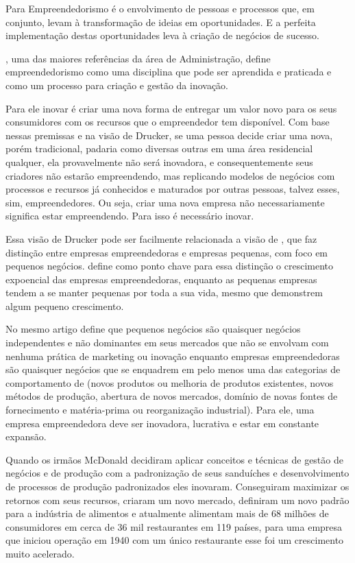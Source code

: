 Para  Empreendedorismo é o envolvimento de pessoas e processos que, em conjunto, levam à transformação de ideias em oportunidades. E a perfeita implementação destas oportunidades leva à criação de negócios de sucesso.

, uma das maiores referências da área de Administração, define empreendedorismo como uma disciplina que pode ser aprendida e praticada e como um processo para criação e gestão da inovação. 

Para ele inovar é criar uma nova forma de entregar um valor novo para os seus consumidores com os recursos que o empreendedor tem disponível. Com base nessas premissas e na visão de Drucker, se uma pessoa decide criar uma nova, porém tradicional, padaria como diversas outras em uma área residencial qualquer, ela provavelmente não será inovadora, e consequentemente seus criadores não estarão empreendendo, mas replicando modelos de negócios com processos e recursos já conhecidos e maturados por outras pessoas, talvez esses, sim, empreendedores. Ou seja, criar uma nova empresa não necessariamente significa estar empreendendo. Para isso é necessário inovar. 

Essa visão de Drucker pode ser facilmente relacionada a visão de , que faz distinção entre empresas empreendedoras e empresas pequenas, com foco em pequenos negócios.  define como ponto chave para essa distinção o crescimento expoencial das empresas empreendedoras, enquanto as pequenas empresas tendem a se manter pequenas por toda a sua vida, mesmo que demonstrem algum pequeno crescimento. 

No mesmo artigo  define que pequenos negócios são quaisquer negócios independentes e não dominantes em seus mercados que não se envolvam com nenhuma prática de marketing ou inovação enquanto empresas empreendedoras são quaisquer negócios que se enquadrem em pelo menos uma das categorias de comportamento de  (novos produtos ou melhoria de produtos existentes, novos métodos de produção, abertura de novos mercados, domínio de novas fontes de fornecimento e matéria-prima ou reorganização industrial). Para ele, uma empresa empreendedora deve ser inovadora, lucrativa e estar em constante expansão.

Quando os irmãos McDonald decidiram aplicar conceitos e técnicas de gestão de negócios e de produção com a padronização de seus sanduíches e desenvolvimento de processos de produção padronizados eles inovaram. Conseguiram maximizar os retornos com seus recursos, criaram um novo mercado, definiram um novo padrão para a indústria de alimentos e atualmente alimentam mais de 68 milhões de consumidores em cerca de 36 mil restaurantes em 119 países, para uma empresa que iniciou operação em 1940 com um único restaurante esse foi um crescimento muito acelerado. 

